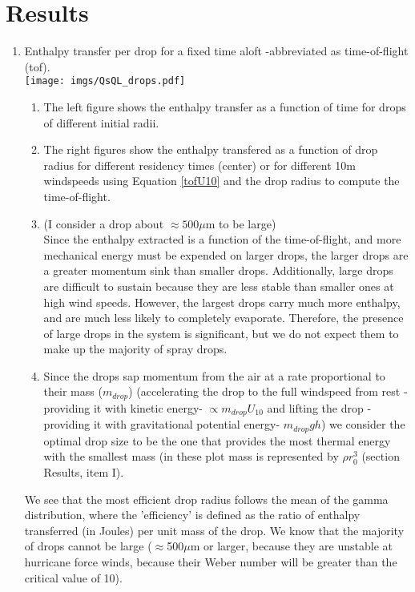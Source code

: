 \documentclass[10pt,a4paper]{article}
\begin{document}
\section{Results}
\begin{enumerate}
\item Enthalpy transfer per drop for a fixed time aloft -abbreviated as time-of-flight (tof).\\
\texttt{[image: imgs/QsQL\_drops.pdf]}
\begin{enumerate}
\item The left figure shows the enthalpy transfer as a function of time for drops of different initial radii.\\
\item The right figures show the enthalpy transfered as a function of drop radius for different residency times (center) or for different 10m windspeeds using Equation \ref{tofU10} and the drop radius to compute the time-of-flight.\\
\item (I consider a drop about $\approx 500\mu$m to be large)\\
 Since the enthalpy extracted is a function of the time-of-flight, and more mechanical energy must be expended on larger drops, the larger drops are a greater momentum sink than smaller drops. Additionally, large drops are difficult to sustain because they are less stable than smaller ones at high wind speeds. However, the largest drops carry much more enthalpy, and are much less likely to completely evaporate. Therefore, the presence of large drops in the system is significant, but we do not expect them to make up the majority of spray drops.
\item Since the drops sap momentum from the air at a rate proportional to their mass ($m_{drop}$) (accelerating the drop to the full windspeed from rest -providing it with kinetic energy- $\propto m_{drop}U_{10}$  and lifting the drop -providing it with gravitational potential energy- $m_{drop}gh$) we consider the optimal drop size to be the one that provides the most thermal energy with the smallest mass (in these plot mass is represented by $\rho r_0^3$ (section Results, item I). 
\end{enumerate}

We see that the most efficient drop radius follows the mean of the gamma distribution, where the 'efficiency' is defined as the ratio of enthalpy transferred (in Joules) per unit mass of the drop. We know that the majority of drops cannot be large ($\approx$500$\mu$m or larger, because they are unstable at hurricane force winds, because their Weber number will be greater than the critical value of 10). 


\end{enumerate}
\end{document}
